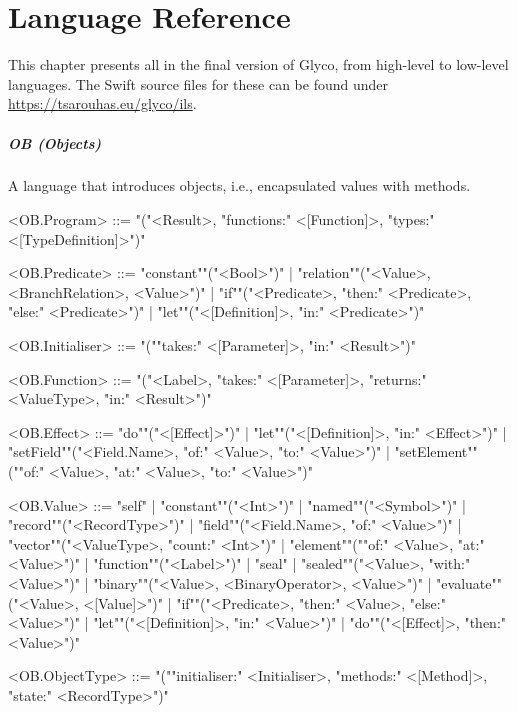 \documentclass[main.tex]{subfiles}
\begin{document}
\onlyinsubfile{\mainmatter{}\appendix{}}

\chapter{Language Reference}
\label{ch:grammar}
This chapter presents all  in the final version of Glyco, from high-level to low-level languages. The Swift source files for these  can be found under \url{https://tsarouhas.eu/glyco/ils}.

\paragraph{ OB (Objects) } A language that introduces objects, i.e., encapsulated values with methods.
\begin{grammar}
	\footnotesize
				<OB.Program> ::=
							"("<Result>, "functions:" <[Function]>, "types:" <[TypeDefinition]>")"
				\par
				<OB.Predicate> ::=
						"constant""("<Bool>")"
						| "relation""("<Value>, <BranchRelation>, <Value>")"
						| "if""("<Predicate>, "then:" <Predicate>, "else:" <Predicate>")"
						| "let""("<[Definition]>, "in:" <Predicate>")"
				\par
				<OB.Initialiser> ::=
							"(""takes:" <[Parameter]>, "in:" <Result>")"
				\par
				<OB.Function> ::=
							"("<Label>, "takes:" <[Parameter]>, "returns:" <ValueType>, "in:" <Result>")"
				\par
				<OB.Effect> ::=
						"do""("<[Effect]>")"
						| "let""("<[Definition]>, "in:" <Effect>")"
						| "setField""("<Field.Name>, "of:" <Value>, "to:" <Value>")"
						| "setElement""(""of:" <Value>, "at:" <Value>, "to:" <Value>")"
				\par
				<OB.Value> ::=
						"self"
						| "constant""("<Int>")"
						| "named""("<Symbol>")"
						| "record""("<RecordType>")"
						| "field""("<Field.Name>, "of:" <Value>")"
						| "vector""("<ValueType>, "count:" <Int>")"
						| "element""(""of:" <Value>, "at:" <Value>")"
						| "function""("<Label>")"
						| "seal"
						| "sealed""("<Value>, "with:" <Value>")"
						| "binary""("<Value>, <BinaryOperator>, <Value>")"
						| "evaluate""("<Value>, <[Value]>")"
						| "if""("<Predicate>, "then:" <Value>, "else:" <Value>")"
						| "let""("<[Definition]>, "in:" <Value>")"
						| "do""("<[Effect]>, "then:" <Value>")"
				\par
				<OB.ObjectType> ::=
							"(""initialiser:" <Initialiser>, "methods:" <[Method]>, "state:" <RecordType>")"

\end{grammar}
\end{document}
